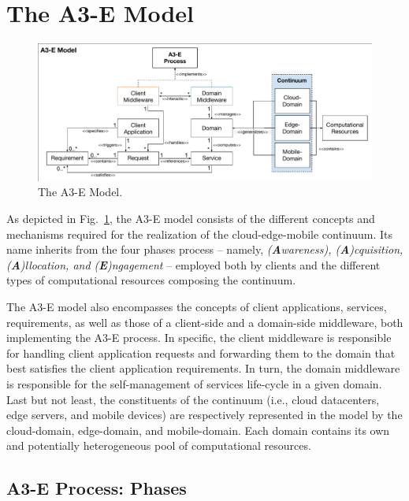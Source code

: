 \section{The A3-E Model}\label{sec:proposal}

\begin{figure}[tbp]
	\includegraphics[width=1\textwidth]{figs/A3-E-model.pdf}
	\caption{The A3-E Model.}
	\label{fig:A3-E-model}
\end{figure}

As depicted in Fig.~\ref{fig:A3-E-model}, the A3-E model consists of the different concepts and mechanisms required for the realization of the cloud-edge-mobile continuum. Its name inherits from the four phases process -- namely, \textit{(\textbf{A}wareness), (\textbf{A})cquisition, (\textbf{A})llocation, and (\textbf{E})ngagement} -- employed both by clients and the different types of computational resources composing the continuum. 

The A3-E model also encompasses the concepts of client applications, services, requirements, as well as those of a client-side and a domain-side middleware, both implementing the A3-E process. In specific, the client middleware is responsible for handling client application requests and forwarding them to the domain that best satisfies the client application requirements.  In turn, the domain middleware is responsible for the self-management of services life-cycle in a given domain. Last but not least, the constituents of the continuum (i.e., cloud datacenters, edge servers, and mobile devices) are respectively represented in the model by the cloud-domain, edge-domain, and mobile-domain. Each domain contains its own and potentially heterogeneous pool of computational resources.

\subsection{A3-E Process: Phases}\label{sec:A3-E-process}

